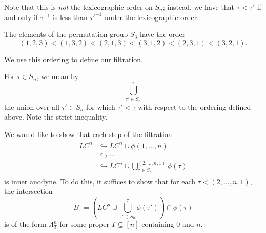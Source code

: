 \documentclass[main.tex]{subfiles}
\begin{document}
Note that this is \emph{not} the lexicographic order on $S_{n}$; instead, we have that $\tau < \tau'$ if and only if $\tau^{-1}$ is less than $\tau'^{-1}$ under the lexicographic order.

\begin{example}
  The elements of the permutation group $S_{3}$ have the order
  \begin{equation*}
    (1,2,3) < (1,3,2) < (2,1,3) < (3,1,2) < (2,3,1) < (3,2,1).
  \end{equation*}
\end{example}

We use this ordering to define our filtration.

\begin{notation}
  For $\tau \in S_{n}$, we mean by
  \begin{equation*}
    \bigcup_{\tau' \in S_{n}}^{\tau}
  \end{equation*}
  the union over all $\tau' \in S_{n}$ for which $\tau' < \tau$ with respect to the ordering defined above. Note the strict inequality.
\end{notation}

We would like to show that each step of the filtration
\begin{align}
  \label{eq:inclusions_inner_anodyne}
  \begin{split}
    LC^{n} &\hookrightarrow LC^{n} \cup \phi(1, \ldots, n) \\
    & \hookrightarrow \cdots \\
    & \hookrightarrow LC^{n} \cup \bigcup_{\tau \in S_{n}}^{(2, \ldots, n, 1)} \phi(\tau)
  \end{split}
\end{align}
is inner anodyne. To do this, it suffices to show that for each $\tau < (2, \ldots, n, 1)$, the intersection
\begin{equation}
  \label{eq:intersections_inner_anodyne}
  B_{\tau} = \left(LC^{n} \cup \bigcup_{\tau' \in S_{n}}^{\tau} \phi(\tau')\right) \cap \phi(\tau)
\end{equation}
is of the form $\Lambda^{n}_{T}$ for some proper $T \subseteq [n]$ containing 0 and $n$.
\end{document}
